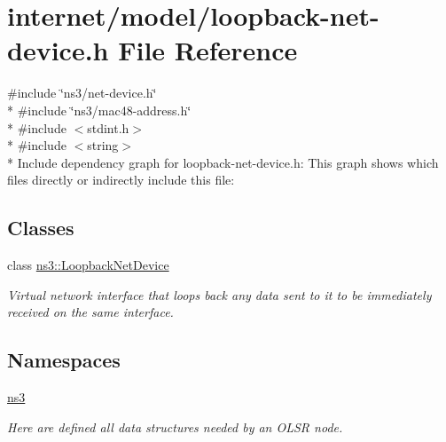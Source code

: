 \hypertarget{loopback-net-device_8h}{}\section{internet/model/loopback-\/net-\/device.h File Reference}
\label{loopback-net-device_8h}
{\ttfamily \#include \char`\"{}ns3/net-\/device.\+h\char`\"{}}\\*
{\ttfamily \#include \char`\"{}ns3/mac48-\/address.\+h\char`\"{}}\\*
{\ttfamily \#include $<$stdint.\+h$>$}\\*
{\ttfamily \#include $<$string$>$}\\*
Include dependency graph for loopback-\/net-\/device.h\+:
This graph shows which files directly or indirectly include this file\+:
\subsection*{Classes}
\begin{DoxyCompactItemize}
\item 
class \hyperlink{classns3_1_1LoopbackNetDevice}{ns3\+::\+Loopback\+Net\+Device}
\begin{DoxyCompactList}\small\item\em Virtual network interface that loops back any data sent to it to be immediately received on the same interface. \end{DoxyCompactList}\end{DoxyCompactItemize}
\subsection*{Namespaces}
\begin{DoxyCompactItemize}
\item 
 \hyperlink{namespacens3}{ns3}
\begin{DoxyCompactList}\small\item\em Here are defined all data structures needed by an O\+L\+SR node. \end{DoxyCompactList}\end{DoxyCompactItemize}
